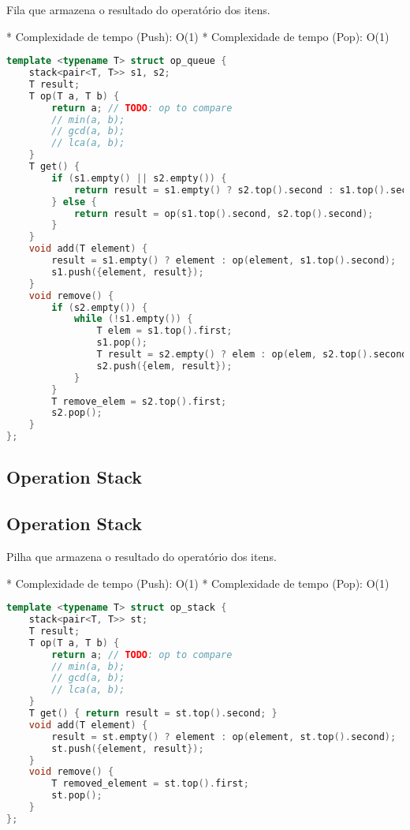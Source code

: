 \documentclass[11pt, a4paper, twoside]{article}
\begin{document}
Fila que armazena o resultado do operatório dos itens.

* Complexidade de tempo (Push): O(1)
* Complexidade de tempo (Pop): O(1)

\begin{lstlisting}[language=C++]
template <typename T> struct op_queue {
    stack<pair<T, T>> s1, s2;
    T result;
    T op(T a, T b) {
        return a; // TODO: op to compare
        // min(a, b);
        // gcd(a, b);
        // lca(a, b);
    }
    T get() {
        if (s1.empty() || s2.empty()) {
            return result = s1.empty() ? s2.top().second : s1.top().second;
        } else {
            return result = op(s1.top().second, s2.top().second);
        }
    }
    void add(T element) {
        result = s1.empty() ? element : op(element, s1.top().second);
        s1.push({element, result});
    }
    void remove() {
        if (s2.empty()) {
            while (!s1.empty()) {
                T elem = s1.top().first;
                s1.pop();
                T result = s2.empty() ? elem : op(elem, s2.top().second);
                s2.push({elem, result});
            }
        }
        T remove_elem = s2.top().first;
        s2.pop();
    }
};
\end{lstlisting}

\subsection{Operation Stack}

\subsection{Operation Stack}



Pilha que armazena o resultado do operatório dos itens.

* Complexidade de tempo (Push): O(1)
* Complexidade de tempo (Pop): O(1)

\begin{lstlisting}[language=C++]
template <typename T> struct op_stack {
    stack<pair<T, T>> st;
    T result;
    T op(T a, T b) {
        return a; // TODO: op to compare
        // min(a, b);
        // gcd(a, b);
        // lca(a, b);
    }
    T get() { return result = st.top().second; }
    void add(T element) {
        result = st.empty() ? element : op(element, st.top().second);
        st.push({element, result});
    }
    void remove() {
        T removed_element = st.top().first;
        st.pop();
    }
};
\end{lstlisting}
\end{document}
